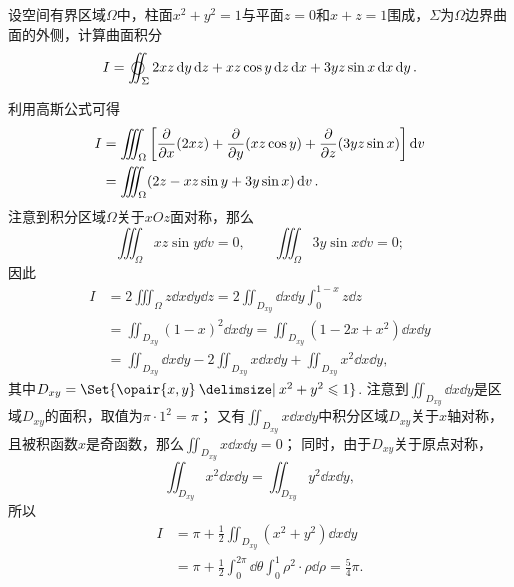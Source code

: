 \begin{example}
设空间有界区域\(\Omega\)中，柱面\(x^2+y^2=1\)与平面\(z=0\)和\(x+z=1\)围成，\(\Sigma\)为\(\Omega\)边界曲面的外侧，计算曲面积分\[
I = \varoiint_{\Sigma} 2xz \dd{y}\dd{z} + xz \cos y \dd{z}\dd{x} + 3yz \sin x \dd{x}\dd{y}.
\]
\begin{solution}
利用高斯公式可得
\begin{align*}
I &= \iiint_{\Omega} \left[ \pdv{x}(2xz) + \pdv{y}(xz \cos y) + \pdv{z}(3yz \sin x) \right] \dd{v} \\
&= \iiint_{\Omega} (2z - xz \sin y + 3y \sin x) \dd{v}.
\end{align*}
注意到积分区域\(\Omega\)关于\(xOz\)面对称，那么\[
\iiint_{\Omega} xz \sin y \dd{v} = 0,
\qquad
\iiint_{\Omega} 3y \sin x \dd{v} = 0;
\]因此\begin{align*}
I &= 2 \iiint_{\Omega} z \dd{x}\dd{y}\dd{z}
= 2 \iint_{D_{xy}} \dd{x}\dd{y} \int_0^{1-x} z \dd{z} \\
&= \iint_{D_{xy}} (1-x)^2 \dd{x}\dd{y}
= \iint_{D_{xy}} (1-2x+x^2) \dd{x}\dd{y} \\
&= \iint_{D_{xy}} \dd{x}\dd{y}
- 2 \iint_{D_{xy}} x \dd{x}\dd{y}
+ \iint_{D_{xy}} x^2 \dd{x}\dd{y},
\end{align*}
其中\(D_{xy} = \Set{\opair{x,y} \given x^2+y^2\leqslant1}\).
注意到\(\iint_{D_{xy}} \dd{x}\dd{y}\)是区域\(D_{xy}\)的面积，取值为\(\pi\cdot1^2=\pi\)；
又有\(\iint_{D_{xy}} x \dd{x}\dd{y}\)中积分区域\(D_{xy}\)关于\(x\)轴对称，且被积函数\(x\)是奇函数，那么\(\iint_{D_{xy}} x \dd{x}\dd{y} = 0\)；
同时，由于\(D_{xy}\)关于原点对称，\[
\iint_{D_{xy}} x^2 \dd{x}\dd{y} = \iint_{D_{xy}} y^2 \dd{x}\dd{y},
\]所以\begin{align*}
I &= \pi + \frac{1}{2} \iint_{D_{xy}} (x^2+y^2) \dd{x}\dd{y} \\
&= \pi + \frac{1}{2}
	\int_0^{2\pi} \dd{\theta} \int_0^1 \rho^2 \cdot \rho\dd{\rho}
= \frac{5}{4} \pi.
\end{align*}
\end{solution}
\end{example}

